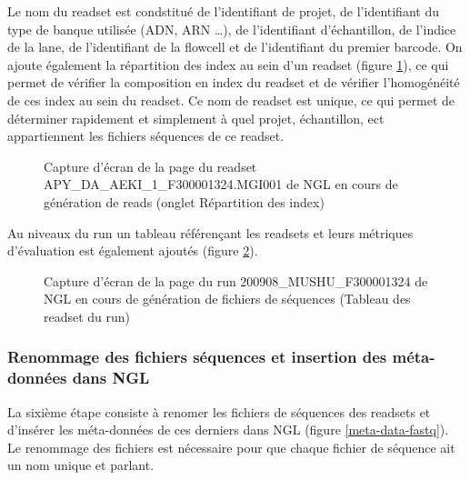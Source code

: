 Le nom du readset est condstitué de l'identifiant de projet, de l'identifiant du type de banque utilisée (ADN, ARN \dots), de l'identifiant d'échantillon, de l'indice de la lane, de l'identifiant de la flowcell et de l'identifiant du premier barcode.
On ajoute également la répartition des index au sein d'un readset (figure \ref{NGL-screenshot_readset-index}), ce qui permet de vérifier la composition en index du readset et de vérifier l'homogénéité de ces index au sein du readset.
Ce nom de readset est unique, ce qui permet de déterminer rapidement et simplement à quel projet, échantillon, ect appartiennent les fichiers séquences de ce readset.

\begin{figure}[H]
    \centering
    \caption{\footnotesize{Capture d'écran de la page du readset APY\_DA\_AEKI\_1\_F300001324.MGI001 de NGL en cours de génération de reads (onglet \og Répartition des index\fg{})}}
    \label{NGL-screenshot_readset-index}
\end{figure}

Au niveaux du run un tableau référençant les readsets et leurs métriques d'évaluation est également ajoutés (figure \ref{NGL-screenshot_tab-run-readset}).

\begin{figure}[H]
    \centering
    \caption{\footnotesize{Capture d'écran de la page du run 200908\_MUSHU\_F300001324 de NGL en cours de génération de fichiers de séquences (Tableau des readset du run)}}
    \label{NGL-screenshot_tab-run-readset}
\end{figure}

\subsubsection{Renommage des fichiers séquences et insertion des méta-données dans NGL}
La sixième étape consiste à renomer les fichiers de séquences des readsets et d'insérer les méta-données de ces derniers dans NGL (figure \ref{meta-data-fastq}).
Le renommage des fichiers est nécessaire pour que chaque fichier de séquence ait un nom unique et \og parlant\fg{}.\\


